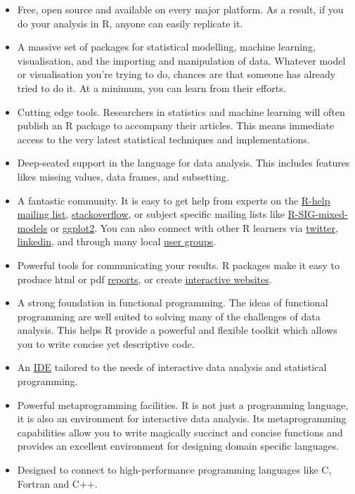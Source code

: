 \begin{itemize}
\item
  Free, open source and available on every major platform. As a result,
  if you do your analysis in R, anyone can easily replicate it.
\item
  A massive set of packages for statistical modelling, machine learning,
  visualisation, and the importing and manipulation of data. Whatever
  model or visualisation you're trying to do, chances are that someone
  has already tried to do it. At a minimum, you can learn from their
  efforts.
\item
  Cutting edge tools. Researchers in statistics and machine learning
  will often publish an R package to accompany their articles. This
  means immediate access to the very latest statistical techniques and
  implementations.
\item
  Deep-seated support in the language for data analysis. This includes
  features likes missing values, data frames, and subsetting.
\item
  A fantastic community. It is easy to get help from experts on the
  \href{https://stat.ethz.ch/mailman/listinfo/r-help}{R-help mailing
  list},
  \href{http://stackoverflow.com/questions/tagged/r}{stackoverflow}, or
  subject specific mailing lists like
  \href{https://stat.ethz.ch/mailman/listinfo/r-sig-mixed-models}{R-SIG-mixed-models}
  or \href{https://groups.google.com/forum/\#!forum/ggplot2}{ggplot2}.
  You can also connect with other R learners via
  \href{https://twitter.com/search?q=\%23rstats}{twitter},
  \href{http://www.linkedin.com/groups/R-Project-Statistical-Computing-77616}{linkedin},
  and through many local
  \href{http://blog.revolutionanalytics.com/local-r-groups.html}{user
  groups}.
\item
  Powerful tools for communicating your results. R packages make it easy
  to produce html or pdf \href{http://yihui.name/knitr/}{reports}, or
  create \href{http://www.rstudio.com/shiny/}{interactive websites}.
\item
  A strong foundation in functional programming. The ideas of functional
  programming are well suited to solving many of the challenges of data
  analysis. This helps R provide a powerful and flexible toolkit which
  allows you to write concise yet descriptive code.
\item
  An \href{http://www.rstudio.com/ide/}{IDE} tailored to the needs of
  interactive data analysis and statistical programming.
\item
  Powerful metaprogramming facilities. R is not just a programming
  language, it is also an environment for interactive data analysis. Its
  metaprogramming capabilities allow you to write magically succinct and
  concise functions and provides an excellent environment for designing
  domain specific languages.
\item
  Designed to connect to high-performance programming languages like C,
  Fortran and C++.
\end{itemize}

